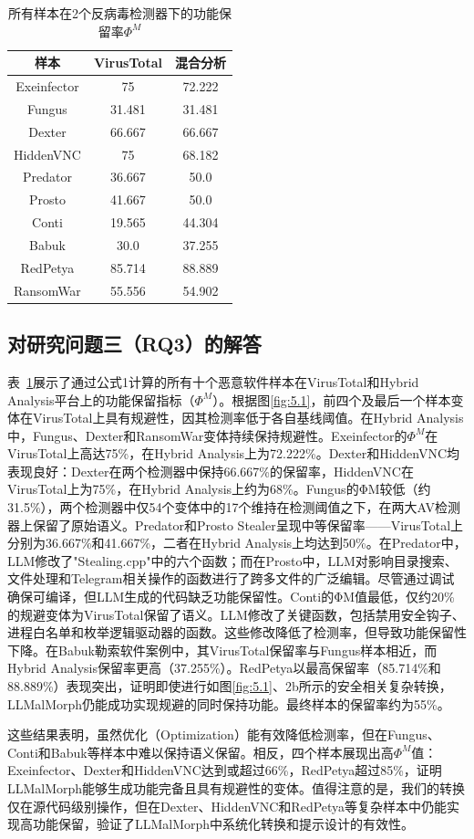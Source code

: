\begin{table}[htbp]
	\centering
	\caption{所有样本在2个反病毒检测器下的功能保留率$\Phi^{M}$}
	\label{tab:5.3}
	\begin{tabular*}{\textwidth}{@{\extracolsep{\fill}}ccc}
		\toprule
		样本 & VirusTotal & 混合分析 \\
		\midrule
		Exeinfector & 75 & 72.222 \\
		Fungus & 31.481 & 31.481 \\
		Dexter & 66.667 & 66.667 \\
		HiddenVNC & 75 & 68.182 \\
		Predator & 36.667 & 50.0 \\
		Prosto & 41.667 & 50.0 \\
		Conti & 19.565 & 44.304 \\
		Babuk & 30.0 & 37.255 \\
		RedPetya & 85.714 & 88.889 \\
		RansomWar & 55.556 & 54.902 \\
		\bottomrule
	\end{tabular*}
\end{table}

\subsection{对研究问题三（RQ3）的解答}

表~\ref{tab:5.3}展示了通过公式1计算的所有十个恶意软件样本在VirusTotal和Hybrid Analysis平台上的功能保留指标（$\Phi^{M}$）。根据图\ref{fig:5.1}，前四个及最后一个样本变体在VirusTotal上具有规避性，因其检测率低于各自基线阈值。在Hybrid Analysis中，Fungus、Dexter和RansomWar变体持续保持规避性。Exeinfector的$\Phi^{M}$在VirusTotal上高达75\%，在Hybrid Analysis上为72.222\%。Dexter和HiddenVNC均表现良好：Dexter在两个检测器中保持66.667\%的保留率，HiddenVNC在VirusTotal上为75\%，在Hybrid Analysis上约为68\%。Fungus的ΦM较低（约31.5\%），两个检测器中仅54个变体中的17个维持在检测阈值之下，在两大AV检测器上保留了原始语义。Predator和Prosto Stealer呈现中等保留率——VirusTotal上分别为36.667\%和41.667\%，二者在Hybrid Analysis上均达到50\%。在Predator中，LLM修改了"Stealing.cpp"中的六个函数；而在Prosto中，LLM对影响目录搜索、文件处理和Telegram相关操作的函数进行了跨多文件的广泛编辑。尽管通过调试确保可编译，但LLM生成的代码缺乏功能保留性。Conti的ΦM值最低，仅约20\%的规避变体为VirusTotal保留了语义。LLM修改了关键函数，包括禁用安全钩子、进程白名单和枚举逻辑驱动器的函数。这些修改降低了检测率，但导致功能保留性下降。在Babuk勒索软件案例中，其VirusTotal保留率与Fungus样本相近，而Hybrid Analysis保留率更高（37.255\%）。RedPetya以最高保留率（85.714\%和88.889\%）表现突出，证明即使进行如图\ref{fig:5.1}、2b所示的安全相关复杂转换，LLMalMorph仍能成功实现规避的同时保持功能。最终样本的保留率约为55\%。

这些结果表明，虽然优化（Optimization）能有效降低检测率，但在Fungus、Conti和Babuk等样本中难以保持语义保留。相反，四个样本展现出高$\Phi^{M}$值：Exeinfector、Dexter和HiddenVNC达到或超过66\%，RedPetya超过85\%，证明LLMalMorph能够生成功能完备且具有规避性的变体。值得注意的是，我们的转换仅在源代码级别操作，但在Dexter、HiddenVNC和RedPetya等复杂样本中仍能实现高功能保留，验证了LLMalMorph中系统化转换和提示设计的有效性。